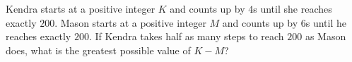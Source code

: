 Kendra starts at a positive integer $K$ and counts up by $4$s until she reaches exactly $200$. Mason starts at a positive integer $M$ and counts up by $6$s until he reaches exactly $200$. If Kendra takes half as many steps to reach $200$ as Mason does, what is the greatest possible value of $K-M$?
